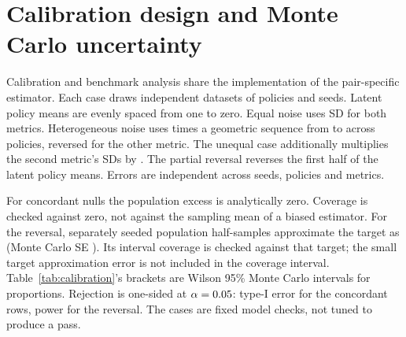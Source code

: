 \documentclass{article}
\begin{document}
\begin{table}[h]
\centering
\footnotesize
\setlength{\tabcolsep}{4pt}
\renewcommand{\arraystretch}{0.92}
\caption{Cross-metric disagreement against the mean pair-specific concordant
floor. Intervals and stars are nominal exploratory diagnostics.}
\label{tab:cells}

\end{table}

\clearpage
\section{Calibration design and Monte Carlo uncertainty}
\label{app:calibration}

Calibration and benchmark analysis share the implementation of the
pair-specific estimator. Each case draws
\CalibrationDatasets{} independent datasets of \CalibrationPolicies{}
policies and \CalibrationSeeds{} seeds. Latent policy means are evenly
spaced from one to zero. Equal noise uses SD \CalibrationSigma{} for both
metrics. Heterogeneous noise uses \CalibrationSigma{} times a geometric
sequence from \CalibrationSigmaLow{} to \CalibrationSigmaHigh{} across
policies, reversed for the other metric. The unequal case additionally
multiplies the second metric's SDs by \CalibrationNoiseRatio{}.
The partial reversal reverses the first half of the latent policy means.
Errors are independent across seeds, policies and metrics.

For concordant nulls the population excess is analytically zero. Coverage
is checked against zero, not against the sampling mean of a biased estimator.
For the reversal, \CalibrationPopulationDraws{} separately seeded
population half-samples approximate the target as
\CalibrationPopulationTarget{} (Monte Carlo SE
\CalibrationPopulationSE{}). Its interval coverage is checked against that
target; the small target approximation error is not included in the coverage
interval. Table~\ref{tab:calibration}'s brackets are Wilson 95\% Monte Carlo
intervals for proportions. Rejection is one-sided at $\alpha=0.05{}$:
type-I error for the concordant rows, power for the reversal. The cases are
fixed model checks, not tuned to produce a pass.

\begin{table}[h]
\centering
\footnotesize
\setlength{\tabcolsep}{3pt}
\caption{Finite-sample calibration of the revised estimator. Nominal interval
coverage is 95\%; rejection rate alone is not a calibration guarantee.}
\label{tab:calibration}

\end{table}
\end{document}
